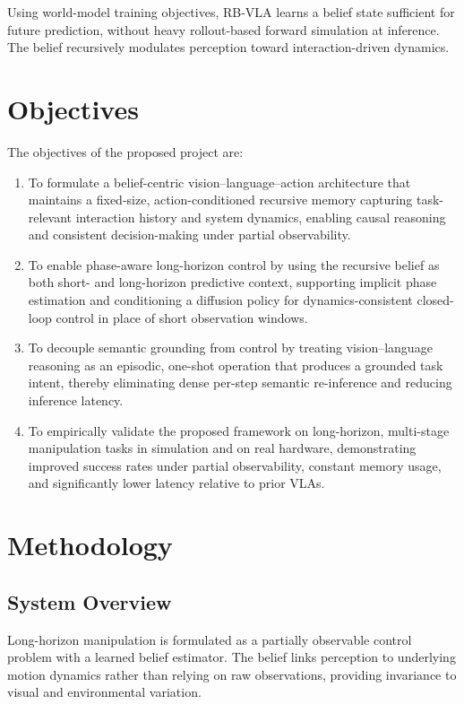 \documentclass[12pt]{article}
\begin{document}
Using world-model training objectives, RB-VLA learns a belief state sufficient for future prediction, without heavy rollout-based forward simulation at inference. The belief recursively modulates perception toward interaction-driven dynamics.

\section{Objectives}
The objectives of the proposed project are:
\begin{enumerate}
    \item To formulate a belief-centric vision--language--action architecture that maintains a fixed-size, action-conditioned recursive memory capturing task-relevant interaction history and system dynamics, enabling causal reasoning and consistent decision-making under partial observability.
    \item To enable phase-aware long-horizon control by using the recursive belief as both short- and long-horizon predictive context, supporting implicit phase estimation and conditioning a diffusion policy for dynamics-consistent closed-loop control in place of short observation windows.
    \item To decouple semantic grounding from control by treating vision--language reasoning as an episodic, one-shot operation that produces a grounded task intent, thereby eliminating dense per-step semantic re-inference and reducing inference latency.
    \item To empirically validate the proposed framework on long-horizon, multi-stage manipulation tasks in simulation and on real hardware, demonstrating improved success rates under partial observability, constant memory usage, and significantly lower latency relative to prior VLAs.
\end{enumerate}

\section{Methodology}

\subsection{System Overview}
Long-horizon manipulation is formulated as a partially observable control problem with a learned belief estimator. The belief links perception to underlying motion dynamics rather than relying on raw observations, providing invariance to visual and environmental variation.
\end{document}
